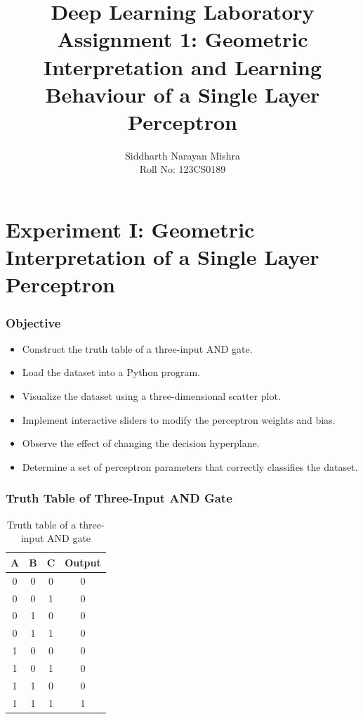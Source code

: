 \documentclass[12pt]{article}
\title{Deep Learning Laboratory\\Assignment 1: Geometric Interpretation and Learning Behaviour of a Single Layer Perceptron}
\author{Siddharth Narayan Mishra\\Roll No: 123CS0189}
\date{}
\begin{document}
\maketitle

\part*{Experiment I: Geometric Interpretation of a Single Layer Perceptron}

\section{Objective}

\begin{itemize}
    \item Construct the truth table of a three-input AND gate.
    \item Load the dataset into a Python program.
    \item Visualize the dataset using a three-dimensional scatter plot.
    \item Implement interactive sliders to modify the perceptron weights and bias.
    \item Observe the effect of changing the decision hyperplane.
    \item Determine a set of perceptron parameters that correctly classifies the dataset.
\end{itemize}

\section{Truth Table of Three-Input AND Gate}

\begin{table}[H]
    \centering
    \begin{tabular}{cccc}
        \toprule
        A & B & C & Output \\
        \midrule
        0 & 0 & 0 & 0      \\
        0 & 0 & 1 & 0      \\
        0 & 1 & 0 & 0      \\
        0 & 1 & 1 & 0      \\
        1 & 0 & 0 & 0      \\
        1 & 0 & 1 & 0      \\
        1 & 1 & 0 & 0      \\
        1 & 1 & 1 & 1      \\
        \bottomrule
    \end{tabular}
    \caption{Truth table of a three-input AND gate}
\end{table}
\end{document}
